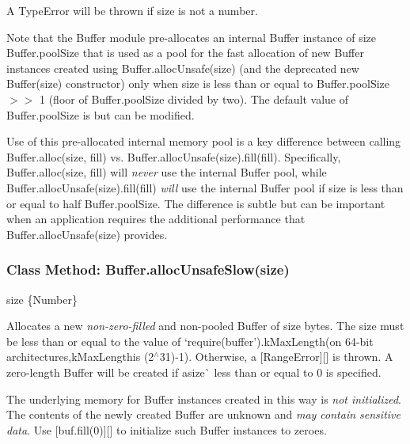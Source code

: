 A {\ttfamily Type\+Error} will be thrown if {\ttfamily size} is not a number.

Note that the {\ttfamily Buffer} module pre-\/allocates an internal {\ttfamily Buffer} instance of size {\ttfamily Buffer.\+pool\+Size} that is used as a pool for the fast allocation of new {\ttfamily Buffer} instances created using {\ttfamily Buffer.\+alloc\+Unsafe(size)} (and the deprecated {\ttfamily new Buffer(size)} constructor) only when {\ttfamily size} is less than or equal to {\ttfamily Buffer.\+pool\+Size $>$$>$ 1} (floor of {\ttfamily Buffer.\+pool\+Size} divided by two). The default value of {\ttfamily Buffer.\+pool\+Size} is {} but can be modified.

Use of this pre-\/allocated internal memory pool is a key difference between calling {\ttfamily Buffer.\+alloc(size, fill)} vs. {\ttfamily Buffer.\+alloc\+Unsafe(size).fill(fill)}. Specifically, {\ttfamily Buffer.\+alloc(size, fill)} will {\itshape never} use the internal Buffer pool, while {\ttfamily Buffer.\+alloc\+Unsafe(size).fill(fill)} {\itshape will} use the internal Buffer pool if {\ttfamily size} is less than or equal to half {\ttfamily Buffer.\+pool\+Size}. The difference is subtle but can be important when an application requires the additional performance that {\ttfamily Buffer.\+alloc\+Unsafe(size)} provides.

\subsubsection*{Class Method\+: Buffer.\+alloc\+Unsafe\+Slow(size)}


\begin{DoxyItemize}
\item {\ttfamily size} \{Number\}
\end{DoxyItemize}

Allocates a new {\itshape non-\/zero-\/filled} and non-\/pooled {\ttfamily Buffer} of {\ttfamily size} bytes. The {\ttfamily size} must be less than or equal to the value of `require(\textquotesingle{}buffer').k\+Max\+Length{\ttfamily (on 64-\/bit architectures,}k\+Max\+Length{\ttfamily is }(2$^\wedge$31)-\/1{\ttfamily ). Otherwise, a \mbox{[}}Range\+Error{\ttfamily \mbox{]}\mbox{[}\mbox{]} is thrown. A zero-\/length Buffer will be created if a}size\`{} less than or equal to 0 is specified.

The underlying memory for {\ttfamily Buffer} instances created in this way is {\itshape not initialized}. The contents of the newly created {\ttfamily Buffer} are unknown and {\itshape may contain sensitive data}. Use \mbox{[}{\ttfamily buf.\+fill(0)}\mbox{]}\mbox{[}\mbox{]} to initialize such {\ttfamily Buffer} instances to zeroes.

